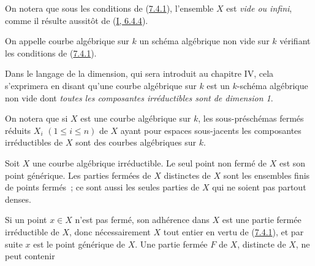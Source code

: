 On notera que sous les conditions de (\hyperref[II.7.4.1-fr]{7.4.1}),
l'ensemble $X$ est \emph{vide ou infini}, comme il résulte aussitôt de
(\hyperref[I.6.4.4-fr]{I, 6.4.4}).

\begin{definition}[7.4.2]
\label{II.7.4.2-fr}
On appelle courbe algébrique sur $k$ un schéma algébrique non vide sur $k$
vérifiant les conditions de (\hyperref[II.7.4.1-fr]{7.4.1}).
\end{definition}

Dans le langage de la dimension, qui sera introduit au chapitre IV, cela
s'exprimera en disant qu'une courbe algébrique sur $k$ est un $k$-schéma
algébrique non vide dont \emph{toutes les composantes irréductibles sont de
dimension 1}.

On notera que si $X$ est une courbe algébrique sur $k$, les sous-préschémas
fermés réduits $X_i$ $(1\leq i\leq n)$ de $X$ ayant pour espaces sous-jacents
les composantes irréductibles de $X$ sont des courbes algébriques sur $k$.

\begin{corollary}[7.4.3]
\label{II.7.4.3-fr}
Soit $X$ une courbe algébrique irréductible. Le seul point non fermé de $X$ est
son point générique. Les parties fermées de $X$ distinctes de $X$ sont les
ensembles finis de points fermés~; ce sont aussi les seules parties de $X$ qui
ne soient pas partout denses.
\end{corollary}

Si un point $x\in X$ n'est pas fermé, son adhérence dans $X$ est une partie
fermée irréductible de $X$, donc nécessairement $X$ tout entier en vertu de
(\hyperref[II.7.4.1-fr]{7.4.1}), et par suite $x$ est le point générique de
$X$. Une partie fermée $F$ de $X$, distincte de $X$, ne peut contenir

